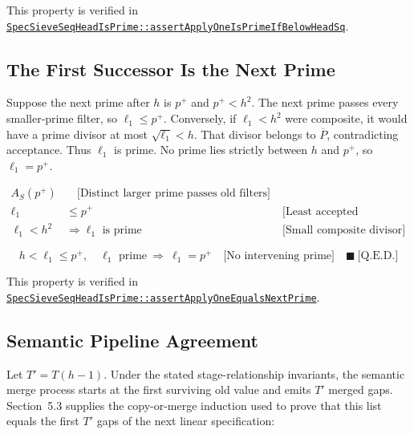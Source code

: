 {\raggedright
This property is verified in
\href{https://github.com/thiagomata/prime-numbers/blob/master/src/main/scala/v1/chapter6/sieve/seq/spec/properties/SpecSieveSeqHeadIsPrime.scala}{\texttt{SpecSieveSeqHeadIsPrime::assertApplyOneIsPrimeIfBelowHeadSq}}.
\par}

\subsection{The First Successor Is the Next Prime}
\label{sec:first-successor-is-next-prime}

Suppose the next prime after $h$ is $p^+$ and $p^+\lt h^2$. The next
prime passes every smaller-prime filter, so $\ell_1\le p^+$. Conversely,
if $\ell_1\lt h^2$ were composite, it would have a prime divisor at most
$\sqrt{\ell_1}\lt h$. That divisor belongs to $\overline{P}$,
contradicting acceptance. Thus $\ell_1$ is prime. No prime lies strictly
between $h$ and $p^+$, so $\ell_1=p^+$.

\begin{equation*}
\begin{aligned}
A_S(p^+) &\quad\text{[Distinct larger prime passes old filters]} \\
\ell_1 &\le p^+
  &&\text{[Least accepted successor]} \\
\ell_1 \lt h^2
  &\Longrightarrow \ell_1\text{ is prime}
  &&\text{[Small composite divisor]}
\end{aligned}
\end{equation*}

\begin{equation*}
h\lt\ell_1\le p^+,\quad \ell_1\text{ prime}
\ \Longrightarrow\ \ell_1=p^+
\quad\text{[No intervening prime]}\quad\blacksquare\ \text{[Q.E.D.]}
\end{equation*}

{\raggedright
This property is verified in
\href{https://github.com/thiagomata/prime-numbers/blob/master/src/main/scala/v1/chapter6/sieve/seq/spec/properties/SpecSieveSeqHeadIsPrime.scala}{\texttt{SpecSieveSeqHeadIsPrime::assertApplyOneEqualsNextPrime}}.
\par}

\subsection{Semantic Pipeline Agreement}
\label{sec:semantic-pipeline-agreement}

Let $T'=T(h-1)$. Under the stated stage-relationship invariants, the
semantic merge process starts at the first surviving old value and emits
$T'$ merged gaps. Section~5.3 supplies the copy-or-merge induction used
to prove that this list equals the first $T'$ gaps of the next linear
specification:

